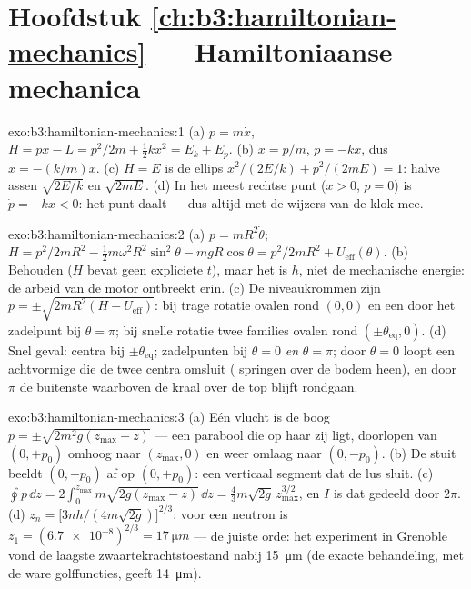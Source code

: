 \section*{Hoofdstuk \ref{ch:b3:hamiltonian-mechanics} --- Hamiltoniaanse mechanica}

\begin{solution}{exo:b3:hamiltonian-mechanics:1}
(a) $p = m\dot x$, $H = p\dot x - L = p^2/2m + \tfrac12 kx^2 = E_k +
E_p$. (b) $\dot x = p/m$, $\dot p = -kx$, dus $\ddot x = -(k/m)x$.
(c) $H = E$ is de ellips $x^2/(2E/k) + p^2/(2mE) = 1$: halve assen
$\sqrt{2E/k}$ en $\sqrt{2mE}$. (d) In het meest rechtse punt ($x > 0$,
$p = 0$) is $\dot p = -kx < 0$: het punt daalt --- dus altijd met de
wijzers van de klok mee.
\end{solution}

\begin{solution}{exo:b3:hamiltonian-mechanics:2}
(a) $p = mR^2\dot\theta$; $H = p^2/2mR^2 - \tfrac12 m\omega^2R^2
\sin^2\theta - mgR\cos\theta = p^2/2mR^2 + U_{\text{eff}}(\theta)$.
(b) Behouden ($H$ bevat geen expliciete $t$), maar het is $h$, niet de
mechanische energie: de arbeid van de motor ontbreekt erin. (c) De
niveaukrommen zijn $p = \pm\sqrt{2mR^2(H - U_{\text{eff}})}$: bij trage
rotatie ovalen rond $(0, 0)$ en een  door het zadelpunt bij
$\theta = \pi$; bij snelle rotatie twee families ovalen rond
$(\pm\theta_{\text{eq}}, 0)$. (d) Snel geval: centra bij
$\pm\theta_{\text{eq}}$; zadelpunten bij $\theta = 0$ \emph{en} $\theta =
\pi$; door $\theta = 0$ loopt een achtvormige  die de twee
centra omsluit ( springen over de bodem heen), en door
$\pi$ de buitenste  waarboven de kraal over de top blijft
rondgaan.
\end{solution}

\begin{solution}{exo:b3:hamiltonian-mechanics:3}
(a) Eén vlucht is de boog $p = \pm\sqrt{2m^2g(z_{\max} - z)}$ --- een
parabool die op haar zij ligt, doorlopen van $(0, +p_0)$ omhoog naar
$(z_{\max}, 0)$ en weer omlaag naar $(0, -p_0)$. (b) De stuit beeldt
$(0, -p_0)$ af op $(0, +p_0)$: een verticaal segment dat de lus sluit.
(c) $\oint p\,\dd z = 2\int_0^{z_{\max}}m\sqrt{2g(z_{\max} - z)}\,\dd z =
\tfrac43 m\sqrt{2g}\,z_{\max}^{3/2}$, en $I$ is dat gedeeld door $2\pi$.
(d) $z_n = \big[3nh/(4m\sqrt{2g})\big]^{2/3}$: voor een neutron is $z_1 =
(\num{6.7e-8})^{2/3} = \qty{17}{\micro m}$ --- de juiste orde: het
experiment in Grenoble vond de laagste zwaartekrachtstoestand nabij
\qty{15}{\micro m} (de exacte behandeling, met de ware golffuncties,
geeft \qty{14}{\micro m}).
\end{solution}

